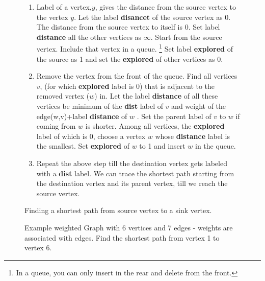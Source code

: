 \begin{figure} 
\begin{enumerate}
\item  Label of a vertex,$y$, gives the distance from the source vertex to the vertex $y$.  Let the label \textbf{disancet} of the source vertex as 0. The distance from the source vertex to itself is 0. Set label \textbf{distance} all the other vertices as $\infty$. Start from the source vertex. Include that vertex in a queue. \footnote{ In a queue, you can only insert in the rear and delete from the front.} Set label \textbf{explored} of the source as 1 and set the \textbf{explored} of other vertices as 0.
\item Remove the vertex from the front of the queue. Find all vertices $v$, (for which \textbf{explored} label is 0) that is adjacent to the removed vertex ($w$) in. Let the label \textbf{distance} of all these vertices be minimum of the \textbf{dist} label of $v$ and weight of the edge(w,v)+label \textbf{distance} of $w$ .  Set the parent label of $v$ to $w$ if coming from $w$ is shorter. Among all vertices, the \textbf{explored} label of which is 0, choose a vertex $w$ whose \textbf{distance} label is the smallest. Set \textbf{explored} of $w$ to 1 and insert $w$ in the queue.
\item Repeat the above step till the destination vertex gets labeled with a \textbf{dist} label. We can trace the shortest path starting from the destination vertex and its parent vertex, till we reach the source vertex.
\end{enumerate}
\caption{Finding a shortest path from source vertex to a sink vertex.}\label{12a2}
\end{figure}

\begin{figure}
\begin{center}
\caption{ Example weighted Graph with 6 vertices and 7 edges - weights are associated with edges. Find the shortest path from vertex 1 to vertex 6.}\label{12g8}
\end{center}
\end{figure}

